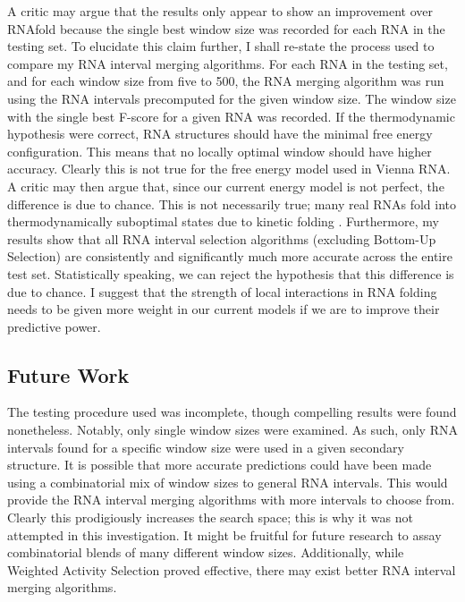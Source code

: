 \documentclass{cshonours}
\begin{document}
A critic may argue that the results only appear to show an improvement over RNAfold because the single best window size was recorded for each RNA in the testing set. To elucidate this claim further, I shall re-state the process used to compare my RNA interval merging algorithms. For each RNA in the testing set, and for each window size from five to 500, the RNA merging algorithm was run using the RNA intervals precomputed for the given window size. The window size with the single best F-score for a given RNA was recorded. If the thermodynamic hypothesis were correct, RNA structures should have the minimal free energy configuration. This means that no locally optimal window should have higher accuracy. Clearly this is not true for the free energy model used in Vienna RNA. A critic may then argue that, since our current energy model is not perfect, the difference is due to chance. This is not necessarily true; many real RNAs fold into thermodynamically suboptimal states due to kinetic folding \cite{ditzler2008rugged, treiber2001beyond}. Furthermore, my results show that all RNA interval selection algorithms (excluding Bottom-Up Selection) are consistently and significantly much more accurate across the entire test set. Statistically speaking, we can reject the hypothesis that this difference is due to chance. I suggest that the strength of local interactions in RNA folding needs to be given more weight in our current models if we are to improve their predictive power.

\subsection{Future Work}

The testing procedure used was incomplete, though compelling results were found nonetheless. Notably, only single window sizes were examined. As such, only RNA intervals found for a specific window size were used in a given secondary structure. It is possible that more accurate predictions could have been made using a combinatorial mix of window sizes to general RNA intervals. This would provide the RNA interval merging algorithms with more intervals to choose from. Clearly this prodigiously increases the search space; this is why it was not attempted in this investigation. It might be fruitful for future research to assay combinatorial blends of many different window sizes. Additionally, while Weighted Activity Selection proved effective, there may exist better RNA interval merging algorithms.
\end{document}

